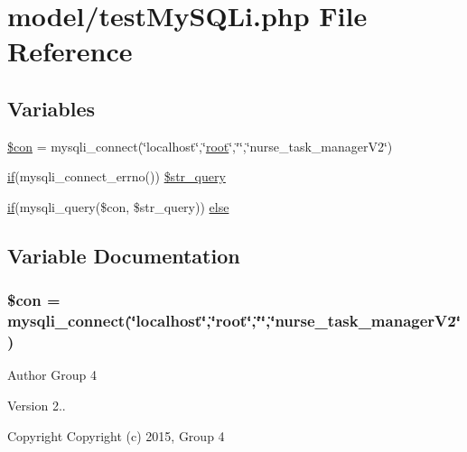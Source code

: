 \hypertarget{test_my_s_q_li_8php}{}\section{model/test\+My\+S\+Q\+Li.php File Reference}
\label{test_my_s_q_li_8php}
\subsection*{Variables}
\begin{DoxyCompactItemize}
\item 
\hyperlink{test_my_s_q_li_8php_a0debe10448ec56a57b5509648408a549}{\$con} = mysqli\+\_\+connect(\char`\"{}localhost\char`\"{},\char`\"{}\hyperlink{rickshaw_8min_8js_a11a10a6834f3c54a5380f4ff04d002a9}{root}\char`\"{},\char`\"{}\char`\"{},\char`\"{}nurse\+\_\+task\+\_\+manager\+V2\char`\"{})
\item 
\hyperlink{ec2c8835c9f9fbb7b8cd36464b491e73_8js_ad1eade1809460358d53dba6e1c599a79}{if}(mysqli\+\_\+connect\+\_\+errno()) \hyperlink{test_my_s_q_li_8php_afde3e504e8907bba3a5dcde60c537684}{\$str\+\_\+query}
\item 
\hyperlink{ec2c8835c9f9fbb7b8cd36464b491e73_8js_ad1eade1809460358d53dba6e1c599a79}{if}(mysqli\+\_\+query(\$con, \$str\+\_\+query)) \hyperlink{test_my_s_q_li_8php_ac9f66270db9e132395b030ed84d6ddb5}{else}
\end{DoxyCompactItemize}


\subsection{Variable Documentation}
\hypertarget{test_my_s_q_li_8php_a0debe10448ec56a57b5509648408a549}{}
\subsubsection[{\$con}]{\setlength{\rightskip}{0pt plus 5cm}\$con = mysqli\+\_\+connect(\char`\"{}localhost\char`\"{},\char`\"{}{\bf root}\char`\"{},\char`\"{}\char`\"{},\char`\"{}nurse\+\_\+task\+\_\+manager\+V2\char`\"{})}\label{test_my_s_q_li_8php_a0debe10448ec56a57b5509648408a549}
\begin{DoxyAuthor}{Author}
Group 4 
\end{DoxyAuthor}
\begin{DoxyVersion}{Version}
2.. 
\end{DoxyVersion}
\begin{DoxyCopyright}{Copyright}
Copyright (c) 2015, Group 4 
\end{DoxyCopyright}
\hypertarget{test_my_s_q_li_8php_afde3e504e8907bba3a5dcde60c537684}{}
